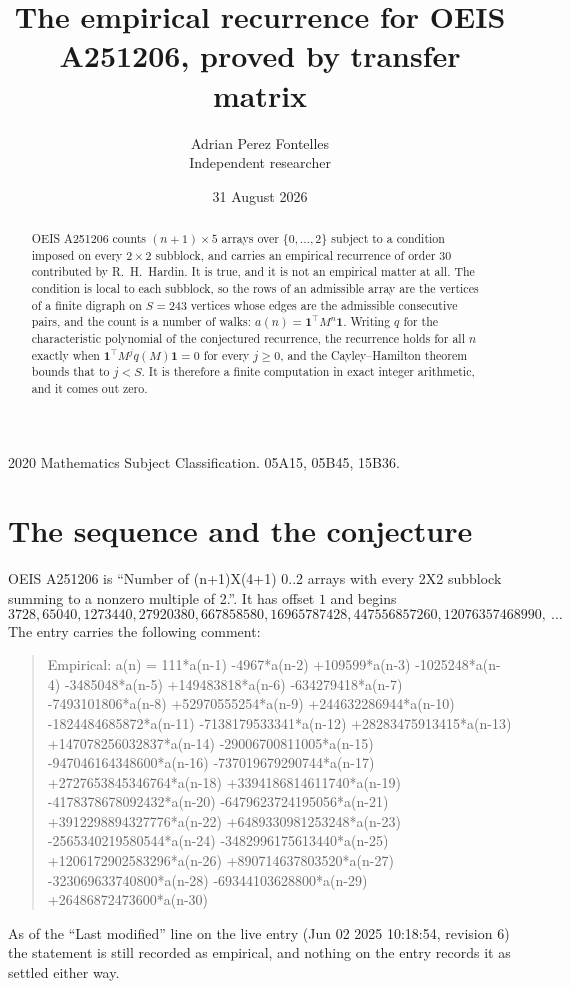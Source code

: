 \documentclass[11pt,a4paper]{article}
\title{The empirical recurrence for OEIS A251206, proved by transfer matrix}
\author{Adrian Perez Fontelles\\ \small Independent researcher}
\date{31 August 2026}
\theoremstyle{plain}
\theoremstyle{definition}
\begin{document}
\maketitle

\begin{abstract}
OEIS A251206 counts $(n+1)\times5$ arrays over $\{0,\dots,2\}$ subject to a condition imposed on
every $2\times2$ subblock, and carries an empirical recurrence of order $30$ contributed
by R.~H.~Hardin. It is true, and it is not an empirical matter at all. The condition is local
to each subblock, so the rows of an admissible array are the vertices of a finite digraph
on $S=243$ vertices whose edges are the admissible consecutive pairs, and the count is a
number of walks: $a(n)=\mathbf{1}^{\!\top}M^{n}\mathbf{1}$. Writing $q$
for the characteristic polynomial of the conjectured recurrence, the recurrence holds for all
$n$ exactly when $\mathbf{1}^{\!\top}M^{j}q(M)\mathbf{1}=0$ for every $j\ge0$, and the
Cayley--Hamilton theorem bounds that to $j<S$. It is therefore a finite computation in exact
integer arithmetic, and it comes out zero.
\end{abstract}

\noindent\small 2020 Mathematics Subject Classification. 05A15, 05B45, 15B36.\normalsize

\section{The sequence and the conjecture}

OEIS A251206 is ``Number of (n+1)X(4+1) 0..2 arrays with every 2X2 subblock summing to a nonzero multiple of 2.''. It has offset $1$ and begins
\[
3728, 65040, 1273440, 27920380, 667858580, 16965787428, 447556857260, 12076357468990,\ \dots
\]
The entry carries the following comment:
\begin{quote}\small
Empirical: a(n) = 111*a(n-1) -4967*a(n-2) +109599*a(n-3) -1025248*a(n-4) -3485048*a(n-5) +149483818*a(n-6) -634279418*a(n-7) -7493101806*a(n-8) +52970555254*a(n-9) +244632286944*a(n-10) -1824484685872*a(n-11) -7138179533341*a(n-12) +28283475913415*a(n-13) +147078256032837*a(n-14) -29006700811005*a(n-15) -947046164348600*a(n-16) -737019679290744*a(n-17) +2727653845346764*a(n-18) +3394186814611740*a(n-19) -4178378678092432*a(n-20) -6479623724195056*a(n-21) +3912298894327776*a(n-22) +6489330981253248*a(n-23) -2565340219580544*a(n-24) -3482996175613440*a(n-25) +1206172902583296*a(n-26) +890714637803520*a(n-27) -323069633740800*a(n-28) -69344103628800*a(n-29) +26486872473600*a(n-30)
\end{quote}
As of the ``Last modified'' line on the live entry (Jun 02 2025 10:18:54, revision 6) the statement is
still recorded as empirical, and nothing on the entry records it as settled either way.
\end{document}
